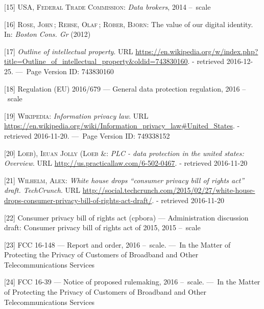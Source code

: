 \documentclass[12pt,english,a4paper,titlepage,cleardoublepage=empty,dottedtoc]{report}
\begin{document}
\hypertarget{ref-report_2014_data-brokers}{}
{[}15{]} \textsc{USA, Federal Trade Commission}: \emph{Data brokers},
2014 --~scale

\hypertarget{ref-whitepaper_2012_the-value-of-our-digital-identity_definition}{}
{[}16{]} \textsc{Rose, John}\,; \textsc{Rehse, Olaf}\,; \textsc{Röber,
Björn}: The value of our digital identity. In: \emph{Boston Cons. Gr}
(2012)

\hypertarget{ref-web_2016_wikipedia_intellectual-property}{}
{[}17{]} \emph{Outline of intellectual property}. URL
\url{https://en.wikipedia.org/w/index.php?title=Outline_of_intellectual_property\&oldid=743830160}.
- retrieved 2016-12-25. ---~Page Version ID: 743830160

\hypertarget{ref-regulation_2016_eu_general-data-protection-regulation_definition}{}
{[}18{]} Regulation (EU) 2016/679 --- General data protection
regulation, 2016 --~scale

\hypertarget{ref-web_2016_wikipedia_information-privacy-law_us}{}
{[}19{]} \textsc{Wikipedia}: \emph{Information privacy law}. URL
\url{https://en.wikipedia.org/wiki/Information_privacy_law\#United_States}.
- retrieved 2016-11-20. ---~Page Version ID: 749338152

\hypertarget{ref-web_2016_data-protection-laws-in-the-us}{}
{[}20{]} \textsc{Loeb), Ieuan Jolly (Loeb \&}: \emph{PLC - data
protection in the united states: Overview}. URL
\url{http://us.practicallaw.com/6-502-0467}. - retrieved 2016-11-20

\hypertarget{ref-web_2015_white-house-releases-consumer-privacy-bill-draft}{}
{[}21{]} \textsc{Wilhelm, Alex}: \emph{White house drops ``consumer
privacy bill of rights act'' draft. TechCrunch}. URL
\url{http://social.techcrunch.com/2015/02/27/white-house-drops-consumer-privacy-bill-of-rights-act-draft/}.
- retrieved 2016-11-20

\hypertarget{ref-bill-draft_2015_us_consumer-privacy-bill-of-rights-act_definition}{}
{[}22{]} Consumer privacy bill of rights act (cpbora) --- Administration
discussion draft: Consumer privacy bill of rights act of 2015, 2015
--~scale

\hypertarget{ref-rules_2016_fcc_to-protect-broadband-consumer-privacy_sensitive-types-of-data}{}
{[}23{]} FCC 16-148 --- Report and order, 2016 --~scale. ---~In the
Matter of Protecting the Privacy of Customers of Broadband and Other
Telecommunications Services

\hypertarget{ref-rules_2016_fcc_to-protect-broadband-consumer-privacy_personally-identifiable-information}{}
{[}24{]} FCC 16-39 --- Notice of proposed rulemaking, 2016 --~scale.
---~In the Matter of Protecting the Privacy of Customers of Broadband
and Other Telecommunications Services
\end{document}
